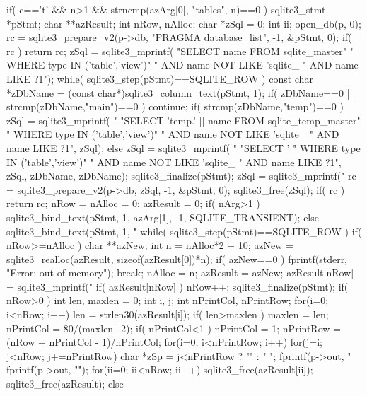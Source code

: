 \begin{Codex}[label=shell.c,numbers=left]
{  if( c=='t' && n>1 && strncmp(azArg[0], "tables", n)==0 ){
    sqlite3_stmt *pStmt;
    char **azResult;
    int nRow, nAlloc;
    char *zSql = 0;
    int ii;
    open_db(p, 0);
    rc = sqlite3_prepare_v2(p->db, "PRAGMA database_list", -1, &pStmt, 0);
    if( rc ) return rc;
    zSql = sqlite3_mprintf(
        "SELECT name FROM sqlite_master"
        " WHERE type IN ('table','view')"
        "   AND name NOT LIKE 'sqlite_%
        "   AND name LIKE ?1");
    while( sqlite3_step(pStmt)==SQLITE_ROW ){
      const char *zDbName = (const char*)sqlite3_column_text(pStmt, 1);
      if( zDbName==0 || strcmp(zDbName,"main")==0 ) continue;
      if( strcmp(zDbName,"temp")==0 ){
        zSql = sqlite3_mprintf(
                 "%
                 "SELECT 'temp.' || name FROM sqlite_temp_master"
                 " WHERE type IN ('table','view')"
                 "   AND name NOT LIKE 'sqlite_%
                 "   AND name LIKE ?1", zSql);
      }else{
        zSql = sqlite3_mprintf(
                 "%
                 "SELECT '%
                 " WHERE type IN ('table','view')"
                 "   AND name NOT LIKE 'sqlite_%
                 "   AND name LIKE ?1", zSql, zDbName, zDbName);
      }
    }
    sqlite3_finalize(pStmt);
    zSql = sqlite3_mprintf("%
    rc = sqlite3_prepare_v2(p->db, zSql, -1, &pStmt, 0);
    sqlite3_free(zSql);
    if( rc ) return rc;
    nRow = nAlloc = 0;
    azResult = 0;
    if( nArg>1 ){
      sqlite3_bind_text(pStmt, 1, azArg[1], -1, SQLITE_TRANSIENT);
    }else{
      sqlite3_bind_text(pStmt, 1, "%
    }
    while( sqlite3_step(pStmt)==SQLITE_ROW ){
      if( nRow>=nAlloc ){
        char **azNew;
        int n = nAlloc*2 + 10;
        azNew = sqlite3_realloc(azResult, sizeof(azResult[0])*n);
        if( azNew==0 ){
          fprintf(stderr, "Error: out of memory\n");
          break;
        }
        nAlloc = n;
        azResult = azNew;
      }
      azResult[nRow] = sqlite3_mprintf("%
      if( azResult[nRow] ) nRow++;
    }
    sqlite3_finalize(pStmt);        
    if( nRow>0 ){
      int len, maxlen = 0;
      int i, j;
      int nPrintCol, nPrintRow;
      for(i=0; i<nRow; i++){
        len = strlen30(azResult[i]);
        if( len>maxlen ) maxlen = len;
      }
      nPrintCol = 80/(maxlen+2);
      if( nPrintCol<1 ) nPrintCol = 1;
      nPrintRow = (nRow + nPrintCol - 1)/nPrintCol;
      for(i=0; i<nPrintRow; i++){
        for(j=i; j<nRow; j+=nPrintRow){
          char *zSp = j<nPrintRow ? "" : "  ";
          fprintf(p->out, "%
        }
        fprintf(p->out, "\n");
      }
    }
    for(ii=0; ii<nRow; ii++) sqlite3_free(azResult[ii]);
    sqlite3_free(azResult);
  }else

}
\end{Codex}
